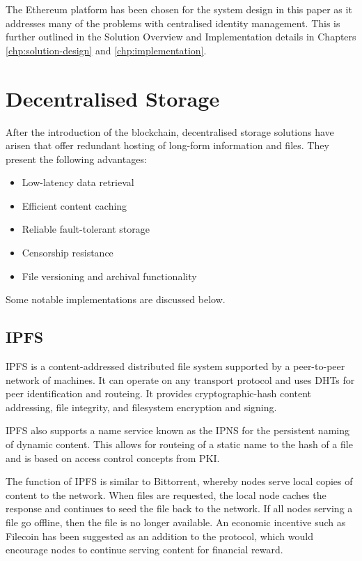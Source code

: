 The Ethereum platform has been chosen for the system design in this paper as it addresses many of the problems with centralised identity management. This is further outlined in the Solution Overview and Implementation details in Chapters \ref{chp:solution-design} and \ref{chp:implementation}.

\section{Decentralised Storage}
After the introduction of the blockchain, decentralised storage solutions have arisen that offer redundant hosting of long-form information and files. They present the following advantages:
\begin{itemize}
	\item Low-latency data retrieval
    \item Efficient content caching
    \item Reliable fault-tolerant storage
    \item Censorship resistance
    \item File versioning and archival functionality
\end{itemize}
Some notable implementations are discussed below.

\subsection{IPFS}
\ac{IPFS} \cite{benet_ipfs_2014} is a content-addressed distributed file system supported by a peer-to-peer network of machines. It can operate on any transport protocol and uses \acp{DHT} for peer identification and routeing. It provides cryptographic-hash content addressing, file integrity, and filesystem encryption and signing.

\ac{IPFS} also supports a name service known as the \ac{IPNS} for the persistent naming of dynamic content. This allows for routeing of a static name to the hash of a file and is based on access control concepts from \ac{PKI}.

The function of \ac{IPFS} is similar to Bittorrent, whereby nodes serve local copies of content to the network. When files are requested, the local node caches the response and continues to seed the file back to the network. If all nodes serving a file go offline, then the file is no longer available. An economic incentive such as Filecoin \cite{filecoin.io_filecoin:_2014} has been suggested as an addition to the protocol, which would encourage nodes to continue serving content for financial reward.

